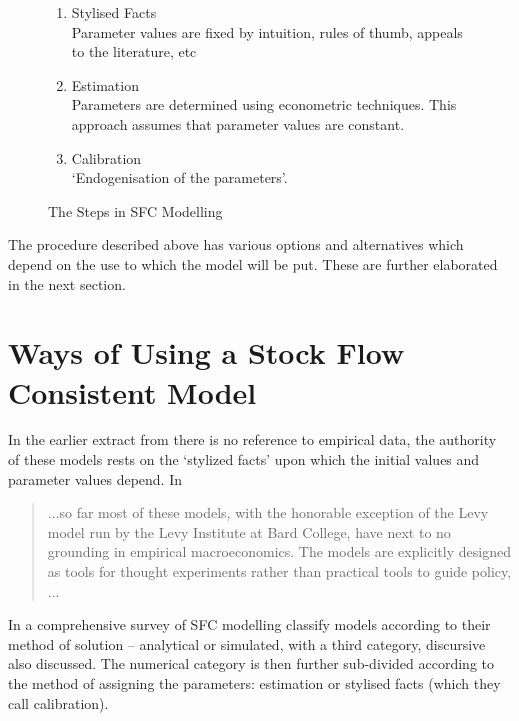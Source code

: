 \documentclass[twoside,a4paper,11pt]{article}
\begin{document}
\begin{figure}[h!]
\begin{enumerate}
         \begin{enumerate}
		\item{Stylised Facts}\\
			Parameter values are fixed by intuition, rules of thumb, appeals to the literature, etc
		\item{Estimation}\\
			Parameters are determined using econometric techniques. This approach assumes  that parameter values are constant.
		\item{Calibration}\\
			`Endogenisation of the parameters'.
         \end{enumerate}
\end{enumerate}
\caption{The Steps in SFC Modelling}
\end{figure}

The procedure described above has various options and alternatives which depend on the use to which the model will be put. These are further elaborated in the next section. 

\section{Ways of Using a Stock Flow Consistent Model}
In the earlier extract from \cite{Godley2007} there is no reference to empirical data, the authority of these models rests on the `stylized facts' upon which the initial values and parameter values depend.
In \cite{Kinsella2011}  
\begin{quotation} ...so far most of these models, with the honorable exception of the Levy model run by the Levy Institute at Bard College, have next to no grounding in empirical macroeconomics. The models are explicitly designed as tools for thought experiments rather than practical tools to guide policy, ...
\end{quotation}

In a comprehensive survey of SFC modelling \cite{Caverzasi2014a} classify models according to their method of solution -- analytical or simulated, with a third category, discursive also discussed. The numerical category is then further sub-divided according to the method of assigning the parameters: estimation or stylised facts (which they call calibration).
\end{document}
